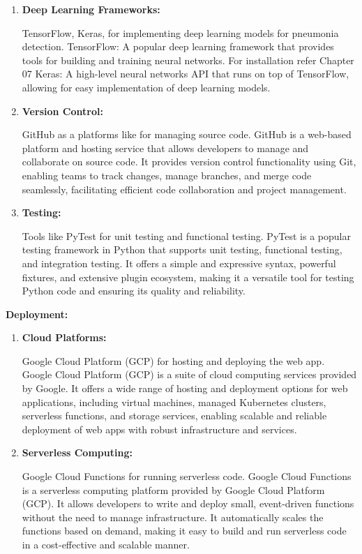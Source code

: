 \begin{enumerate}
	
	\item \textbf {Deep Learning Frameworks:  }
	
	TensorFlow, Keras, for implementing deep learning models for pneumonia detection.
	TensorFlow: A popular deep learning framework that provides tools for building and training neural networks. For installation refer Chapter 07
	Keras: A high-level neural networks API that runs on top of TensorFlow, allowing for easy implementation of deep learning models.
	
	\item \textbf {	Version Control: }
	
	GitHub as a platforms like for managing source code. GitHub is a web-based platform and hosting service that allows developers to manage and collaborate on source code. It provides version control functionality using Git, enabling teams to track changes, manage branches, and merge code seamlessly, facilitating efficient code collaboration and project management.
	
	\item \textbf {	Testing:  }
	
	Tools like PyTest for unit testing and functional testing. PyTest is a popular testing framework in Python that supports unit testing, functional testing, and integration testing. It offers a simple and expressive syntax, powerful fixtures, and extensive plugin ecosystem, making it a versatile tool for testing Python code and ensuring its quality and reliability.
	
\end{enumerate}


\textbf {Deployment:}

\begin{enumerate}
	
	\item \textbf {	Cloud Platforms:  }
	
	Google Cloud Platform (GCP) for hosting and deploying the web app. Google Cloud Platform (GCP) is a suite of cloud computing services provided by Google. It offers a wide range of hosting and deployment options for web applications, including virtual machines, managed Kubernetes clusters, serverless functions, and storage services, enabling scalable and reliable deployment of web apps with robust infrastructure and services.
	
	
	\item \textbf {	Serverless Computing:  }
	
	Google Cloud Functions for running serverless code. Google Cloud Functions is a serverless computing platform provided by Google Cloud Platform (GCP). It allows developers to write and deploy small, event-driven functions without the need to manage infrastructure. It automatically scales the functions based on demand, making it easy to build and run serverless code in a cost-effective and scalable manner.
	
\end{enumerate}


